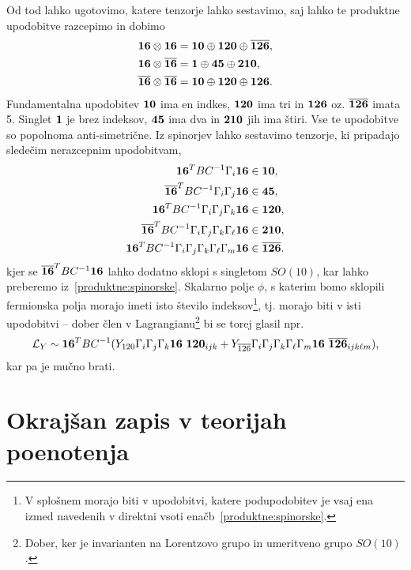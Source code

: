 Od tod lahko ugotovimo, katere tenzorje lahko sestavimo, saj lahko te produktne upodobitve razcepimo
in dobimo
\begin{align}
	\mathbf{16} \otimes \mathbf{16} &= \mathbf{10} \oplus \mathbf{120} \oplus \overline{\mathbf{126}}, \notag \\
	\mathbf{16} \otimes \overline{\mathbf{16}} &= \mathbf{1} \oplus \mathbf{45} \oplus \mathbf{210}, \notag \\
	\overline{\mathbf{16}} \otimes \overline{\mathbf{16}} &= \mathbf{10} \oplus \mathbf{120} \oplus \mathbf{126}.
	\label{produktne:spinorske}
\end{align}
Fundamentalna upodobitev $\mathbf{10}$ ima en indkes, $\mathbf{120}$ ima tri in $\mathbf{126}$ oz. $\overline{\mathbf{126}}$
imata 5. Singlet $\mathbf{1}$ je brez indeksov, $\mathbf{45}$ ima dva in $\mathbf{210}$ jih ima štiri. Vse
te upodobitve so popolnoma anti-simetrične. Iz spinorjev lahko sestavimo tenzorje, ki pripadajo
sledečim nerazcepnim upodobitvam,
\begin{align}
	\mathbf{16}^TBC^{-1}\Gamma_i\mathbf{16} &\in \mathbf{10}, \notag \\
	\overline{\mathbf{16}}^TBC^{-1}\Gamma_i\Gamma_j\mathbf{16} &\in \mathbf{45}, \notag \\
	\mathbf{16}^TBC^{-1}\Gamma_i\Gamma_j\Gamma_k\mathbf{16} &\in \mathbf{120}, \notag \\
	\overline{\mathbf{16}}^TBC^{-1}\Gamma_i\Gamma_j\Gamma_k\Gamma_\ell\mathbf{16} &\in \mathbf{210}, \notag \\
	\mathbf{16}^TBC^{-1}\Gamma_i\Gamma_j\Gamma_k\Gamma_\ell\Gamma_m\mathbf{16} &\in \overline{\mathbf{126}}.
	\label{tenzor:spinor}
\end{align}
kjer se $\overline{\mathbf{16}}^TBC^{-1}\mathbf{16}$ lahko dodatno sklopi s singletom $SO(10)$, kar lahko preberemo
iz~\eqref{produktne:spinorske}.
Skalarno polje $\phi$, s katerim bomo sklopili fermionska polja morajo imeti isto število
indeksov\footnote{V splošnem morajo biti v upodobitvi, katere podupodobitev je vsaj ena izmed
navedenih v direktni vsoti enačb~\eqref{produktne:spinorske}.}, tj. morajo biti v isti
upodobitvi -- dober člen v Lagrangianu\footnote{Dober, ker je invarianten na Lorentzovo grupo in
umeritveno grupo $SO(10)$.} bi se torej glasil npr.
\begin{equation}
	\mathcal{L}_Y \sim \rep{16}^TBC^{-1}(Y_{120}\Gamma_i\Gamma_j\Gamma_k\rep{16}\ \rep{120}_{ijk}
		+ Y_{\overline{126}}\Gamma_i\Gamma_j\Gamma_k\Gamma_\ell\Gamma_m\rep{16}\ 
		\repb{126}_{ijk\ell m}),
	\label{komplikaicija}
\end{equation}
kar pa je mučno brati.

\section{Okrajšan zapis v teorijah poenotenja}


